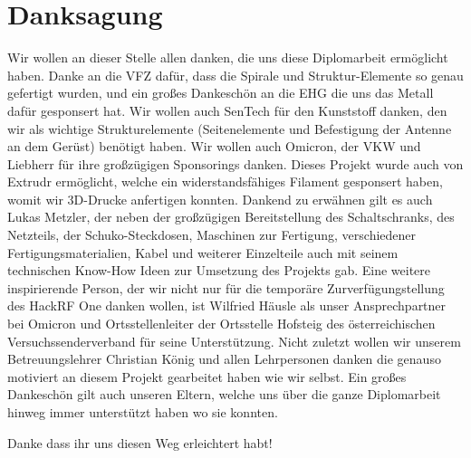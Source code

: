 \chapter*{Danksagung}
\label{chap:Danksagung}
Wir wollen an dieser Stelle allen danken, die uns diese Diplomarbeit ermöglicht haben. Danke an die VFZ dafür, dass die Spirale und Struktur-Elemente so genau gefertigt wurden, und ein großes Dankeschön an die EHG die uns das Metall dafür gesponsert hat. Wir wollen auch SenTech für den Kunststoff danken, den wir als wichtige Strukturelemente (Seitenelemente und Befestigung der Antenne an dem Gerüst) benötigt haben. Wir wollen auch Omicron, der VKW und Liebherr für ihre großzügigen Sponsorings danken. Dieses Projekt wurde auch von Extrudr ermöglicht, welche ein widerstandsfähiges Filament gesponsert haben, womit wir 3D-Drucke anfertigen konnten. Dankend zu erwähnen gilt es auch Lukas Metzler, der neben der großzügigen Bereitstellung des Schaltschranks, des Netzteils, der Schuko-Steckdosen, Maschinen zur Fertigung, verschiedener Fertigungsmaterialien, Kabel und weiterer Einzelteile auch mit seinem technischen Know-How Ideen zur Umsetzung des Projekts gab. Eine weitere inspirierende Person, der wir nicht nur für die temporäre Zurverfügungstellung des HackRF One danken wollen, ist Wilfried Häusle als unser Ansprechpartner bei Omicron und Ortsstellenleiter der Ortsstelle Hofsteig des österreichischen Versuchssenderverband für seine Unterstützung. Nicht zuletzt wollen wir unserem Betreuungslehrer Christian König und allen Lehrpersonen danken die genauso motiviert an diesem Projekt gearbeitet haben wie wir selbst.
Ein großes Dankeschön gilt auch unseren Eltern, welche uns über die ganze Diplomarbeit hinweg immer unterstützt haben wo sie konnten.

Danke dass ihr uns diesen Weg erleichtert habt!
